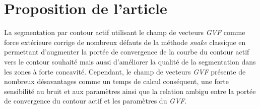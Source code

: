 \section{Proposition de l'article}

La segmentation par contour actif utilisant le champ de vecteurs \textit{GVF} comme force extérieure corrige de nombreux défauts de la méthode \textit{snake} classique en permettant d'augmenter la portée de convergence de la courbe du contour actif vers le contour souhaité mais aussi d'améliorer la qualité de la segmentation dans les zones à forte concavité. Cependant, le champ de vecteurs \textit{GVF} présente de nombreux désavantages comme un temps de calcul conséquent, une forte sensibilité au bruit et aux paramètres ainsi que la relation ambigu entre la portée de convergence du contour actif et les paramètres du \textit{GVF}.